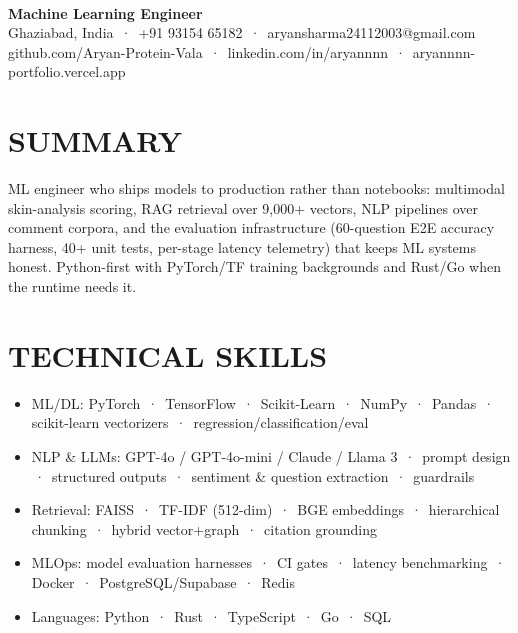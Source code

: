\documentclass[9pt]{article}
\begin{document}
\\[3pt]
{\large\bfseries Machine Learning Engineer}\\[3pt]
{\small\color{greyc} Ghaziabad, India \,·\, +91 93154 65182 \,·\, aryansharma24112003@gmail.com}\vspace{-2pt}
{\small\color{greyc} github.com/Aryan-Protein-Vala \,·\, linkedin.com/in/aryannnn \,·\, aryannnn-portfolio.vercel.app}\vspace{-2pt}
\section*{SUMMARY}
ML engineer who ships models to production rather than notebooks: multimodal skin-analysis scoring, RAG retrieval over 9,000+ vectors, NLP pipelines over comment corpora, and the evaluation infrastructure (60-question E2E accuracy harness, 40+ unit tests, per-stage latency telemetry) that keeps ML systems honest. Python-first with PyTorch/TF training backgrounds and Rust/Go when the runtime needs it.
\vspace{1pt}
\section*{TECHNICAL SKILLS}
\begin{itemize}[leftmargin=11pt,itemsep=0pt,topsep=1pt,parsep=0pt]
\item ML/DL: PyTorch \,·\, TensorFlow \,·\, Scikit-Learn \,·\, NumPy \,·\, Pandas \,·\, scikit-learn vectorizers \,·\, regression/classification/eval
\item NLP \& LLMs: GPT-4o / GPT-4o-mini / Claude / Llama 3 \,·\, prompt design \,·\, structured outputs \,·\, sentiment \& question extraction \,·\, guardrails
\item Retrieval: FAISS \,·\, TF-IDF (512-dim) \,·\, BGE embeddings \,·\, hierarchical chunking \,·\, hybrid vector+graph \,·\, citation grounding
\item MLOps: model evaluation harnesses \,·\, CI gates \,·\, latency benchmarking \,·\, Docker \,·\, PostgreSQL/Supabase \,·\, Redis
\item Languages: Python \,·\, Rust \,·\, TypeScript \,·\, Go \,·\, SQL
\end{itemize}
\end{document}
